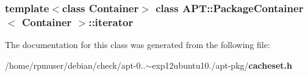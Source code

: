 \subsubsection*{template$<$class \-Container$>$ class A\-P\-T\-::\-Package\-Container$<$ Container $>$\-::iterator}



\-The documentation for this class was generated from the following file\-:\begin{DoxyCompactItemize}
\item 
/home/rpmuser/debian/check/apt-\/0..$\sim$exp12ubuntu10./apt-\/pkg/{\bf cacheset.\-h}\end{DoxyCompactItemize}
